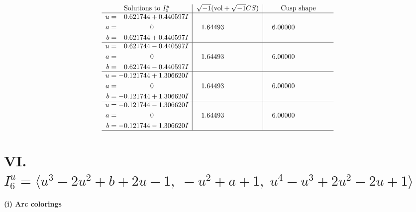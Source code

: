 \documentclass[1p]{elsarticle_modified}
\theoremstyle{definition}
\newcommand{\I}{\sqrt{-1}}
\begin{document}
$$\begin{array}{c|c|c}  
\text{Solutions to }I^u_{5}& \I (\text{vol} + \sqrt{-1}CS) & \text{Cusp shape}\\
 \hline 
\begin{aligned}
u &= \phantom{-}0.621744 + 0.440597 I \\
a &= \phantom{-0.000000 } 0 \\
b &= \phantom{-}0.621744 + 0.440597 I\end{aligned}
 & \phantom{-}1.64493\phantom{ +0.000000I} & \phantom{-}6.00000\phantom{ +0.000000I} \\ \hline\begin{aligned}
u &= \phantom{-}0.621744 - 0.440597 I \\
a &= \phantom{-0.000000 } 0 \\
b &= \phantom{-}0.621744 - 0.440597 I\end{aligned}
 & \phantom{-}1.64493\phantom{ +0.000000I} & \phantom{-}6.00000\phantom{ +0.000000I} \\ \hline\begin{aligned}
u &= -0.121744 + 1.306620 I \\
a &= \phantom{-0.000000 } 0 \\
b &= -0.121744 + 1.306620 I\end{aligned}
 & \phantom{-}1.64493\phantom{ +0.000000I} & \phantom{-}6.00000\phantom{ +0.000000I} \\ \hline\begin{aligned}
u &= -0.121744 - 1.306620 I \\
a &= \phantom{-0.000000 } 0 \\
b &= -0.121744 - 1.306620 I\end{aligned}
 & \phantom{-}1.64493\phantom{ +0.000000I} & \phantom{-}6.00000\phantom{ +0.000000I}\\
 \hline 
 \end{array}$$\newpage\newpage\renewcommand{\arraystretch}{1}
\centering \section*{VI. $I^u_{6}= \langle u^3-2 u^2+b+2 u-1,\;- u^2+a+1,\;u^4- u^3+2 u^2-2 u+1 \rangle$}
\flushleft \textbf{(i) Arc colorings}\\
\end{document}
